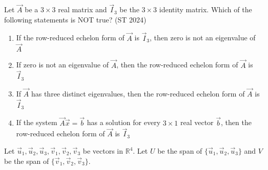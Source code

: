 \item 
Let $\vec{A}$ be a $3 \times 3$ real matrix and $\vec{I}_3$ be the $3 \times 3$ identity matrix.  
Which of the following statements is NOT true?
\hfill (ST 2024)
\begin{enumerate}
\item If the row-reduced echelon form of $\vec{A}$ is $\vec{I}_3$, then zero is not an eigenvalue of $\vec{A}$
\item If zero is not an eigenvalue of $\vec{A}$, then the row-reduced echelon form of $\vec{A}$ is $\vec{I}_3$
\item If $\vec{A}$ has three distinct eigenvalues, then the row-reduced echelon form of $\vec{A}$ is $\vec{I}_3$
\item If the system $\vec{A} \vec{x} = \vec{b}$ has a solution for every $3\times 1$ real vector $\vec{b}$, then the row-reduced echelon form of $\vec{A}$ is $\vec{I}_3$
\end{enumerate}
\item 
Let $\vec{u}_1, \vec{u}_2, \vec{u}_3, \vec{v}_1, \vec{v}_2, \vec{v}_3$ be vectors in $\mathbb{R}^4$. Let $U$ be the span of $\{\vec{u}_1, \vec{u}_2, \vec{u}_3\}$ and $V$ be the span of $\{\vec{v}_1, \vec{v}_2, \vec{v}_3\}$.  

